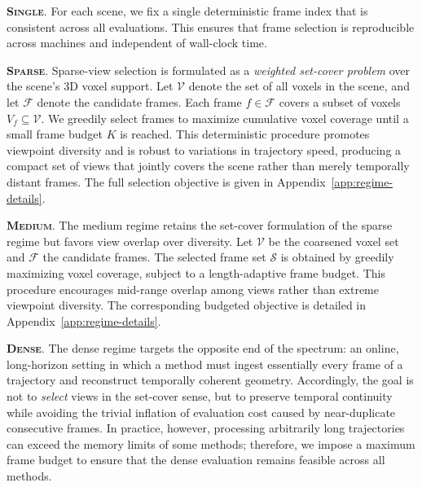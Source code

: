 \documentclass{llmxive}
\begin{document}
\textbf{\textsc{Single}}.
For each scene, we fix a single deterministic frame index that is consistent across all evaluations.
%
This ensures that frame selection is reproducible across machines and independent of wall-clock time.

\textbf{\textsc{Sparse}}.
Sparse-view selection is formulated as a \textit{weighted set-cover problem} over the scene's 3D voxel support.
%
Let $\mathcal{V}$ denote the set of all voxels in the scene, and let $\mathcal{F}$ denote the candidate frames.
%
Each frame $f \in \mathcal{F}$ covers a subset of voxels $V_f \subseteq \mathcal{V}$.
%
We greedily select frames to maximize cumulative voxel coverage until a small frame budget $K$ is reached.
%
This deterministic procedure promotes viewpoint diversity and is robust to variations in trajectory speed, producing a compact set of views that jointly covers the scene rather than merely temporally distant frames.
%
The full selection objective is given in Appendix~\ref{app:regime-details}.

\textbf{\textsc{Medium}}.
The medium regime retains the set-cover formulation of the sparse regime but favors view overlap over diversity.
%
Let $\mathcal{V}$ be the coarsened voxel set and $\mathcal{F}$ the candidate frames.
%
The selected frame set $\mathcal{S}$ is obtained by greedily maximizing voxel coverage, subject to a length-adaptive frame budget.
%
This procedure encourages mid-range overlap among views rather than extreme viewpoint diversity.
%
The corresponding budgeted objective is detailed in Appendix~\ref{app:regime-details}.

\textbf{\textsc{Dense}}.
The dense regime targets the opposite end of the spectrum: an online, long-horizon setting in which a method must ingest essentially every frame of a trajectory and reconstruct temporally coherent geometry. 
%
Accordingly, the goal is not to \emph{select} views in the set-cover sense, but to preserve temporal continuity while avoiding the trivial inflation of evaluation cost caused by near-duplicate consecutive frames. 
%
In practice, however, processing arbitrarily long trajectories can exceed the memory limits of some methods; therefore, we impose a maximum frame budget to ensure that the dense evaluation remains feasible across all methods.

\end{document}
